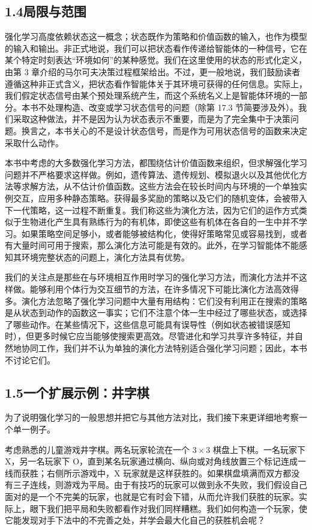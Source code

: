 \documentclass[UTF8,12pt,a4paper,fontset=fandol]{ctexart}
\begin{document}
\subsection*{1.4\quad 局限与范围}

强化学习高度依赖状态这一概念；状态既作为策略和价值函数的输入，也作为模型的输入和输出。非正式地说，我们可以把状态看作传递给智能体的一种信号，它在某个特定时刻表达“环境如何”的某种感觉。我们在这里使用的状态的形式化定义，由第 3 章介绍的马尔可夫决策过程框架给出。不过，更一般地说，我们鼓励读者遵循这种非正式含义，把状态看作智能体关于其环境可获得的任何信息。实际上，我们假定状态信号由某个预处理系统产生，而这个系统名义上是智能体环境的一部分。本书不处理构造、改变或学习状态信号的问题（除第 17.3 节简要涉及外）。我们采取这种做法，并不是因为认为状态表示不重要，而是为了完全集中于决策问题。换言之，本书关心的不是设计状态信号，而是作为可用状态信号的函数来决定采取什么动作。

本书中考虑的大多数强化学习方法，都围绕估计价值函数来组织，但求解强化学习问题并不严格要求这样做。例如，遗传算法、遗传规划、模拟退火以及其他优化方法等求解方法，从不估计价值函数。这些方法会在较长时间内与环境的一个单独实例交互，应用多种静态策略。获得最多奖励的策略以及它们的随机变体，会被带入下一代策略，这一过程不断重复。我们称这些为演化方法，因为它们的运作方式类似于生物进化产生具有熟练行为的有机体，即使这些有机体在各自的一生中并不学习。如果策略空间足够小，或者能够被结构化，使得好策略常见或容易找到，或者有大量时间可用于搜索，那么演化方法可能是有效的。此外，在学习智能体不能感知其环境完整状态的问题上，演化方法具有优势。

我们的关注点是那些在与环境相互作用时学习的强化学习方法，而演化方法并不这样做。能够利用个体行为交互细节的方法，在许多情况下可能比演化方法高效得多。演化方法忽略了强化学习问题中大量有用结构：它们没有利用正在搜索的策略是从状态到动作的函数这一事实；它们不注意个体一生中经过了哪些状态，或选择了哪些动作。在某些情况下，这些信息可能具有误导性（例如状态被错误感知时），但更多时候它应当能够使搜索更高效。尽管进化和学习共享许多特征，并自然地协同工作，我们并不认为单独的演化方法特别适合强化学习问题；因此，本书不讨论它们。

\subsection*{1.5\quad 一个扩展示例：井字棋}

为了说明强化学习的一般思想并把它与其他方法对比，我们接下来更详细地考察一个单一例子。

考虑熟悉的儿童游戏井字棋。两名玩家轮流在一个 $3\times3$ 棋盘上下棋。一名玩家下 X，另一名玩家下 O，直到某名玩家通过横向、纵向或对角线放置三个标记连成一线而获胜；右侧所示游戏中，X 玩家就是这样获胜的。如果棋盘填满而双方都没有三子连线，则游戏为平局。由于有技巧的玩家可以做到永不失败，我们假设自己面对的是一个不完美的玩家，也就是它有时会下错，从而允许我们获胜的玩家。实际上，眼下我们把平局和失败都看作对我们同样糟糕。我们如何构造一个玩家，使它能发现对手下法中的不完善之处，并学会最大化自己的获胜机会呢？
\end{document}
